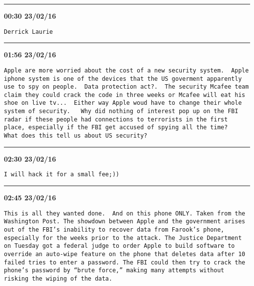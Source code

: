 \hrule%

\begin{adjustwidth}{0cm}{0cm}
\footnotesize \textbf{00:30 23/02/16}

\begin{lstlisting}[breaklines, breakatwhitespace, basicstyle=\small, frame=leftline]
Derrick Laurie
\end{lstlisting}
\end{adjustwidth}

\hrule%

\begin{adjustwidth}{0cm}{0cm}
\footnotesize \textbf{01:56 23/02/16}

\begin{lstlisting}[breaklines, breakatwhitespace, basicstyle=\small, frame=leftline]
Apple are more worried about the cost of a new security system.  Apple iphone system is one of the devices that the US goverment apparently use to spy on people.  Data protection act?.  The security Mcafee team claim they could crack the code in three weeks or Mcafee will eat his shoe on live tv...  Either way Apple woud have to change their whole system of security.   Why did nothing of interest pop up on the FBI radar if these people had connections to terrorists in the first place, especially if the FBI get accused of spying all the time?   What does this tell us about US security?
\end{lstlisting}
\end{adjustwidth}

\hrule%

\begin{adjustwidth}{0cm}{0cm}
\footnotesize \textbf{02:30 23/02/16}

\begin{lstlisting}[breaklines, breakatwhitespace, basicstyle=\small, frame=leftline]
I will hack it for a small fee;))
\end{lstlisting}
\end{adjustwidth}

\hrule%

\begin{adjustwidth}{0cm}{0cm}
\footnotesize \textbf{02:45 23/02/16}

\begin{lstlisting}[breaklines, breakatwhitespace, basicstyle=\small, frame=leftline]
This is all they wanted done.  And on this phone ONLY. Taken from the Washington Post. The showdown between Apple and the government arises out of the FBI’s inability to recover data from Farook’s phone, especially for the weeks prior to the attack. The Justice Department on Tuesday got a federal judge to order Apple to build software to override an auto-wipe feature on the phone that deletes data after 10 failed tries to enter a password. The FBI could then try to crack the phone’s password by “brute force,” making many attempts without risking the wiping of the data.
\end{lstlisting}
\end{adjustwidth}

